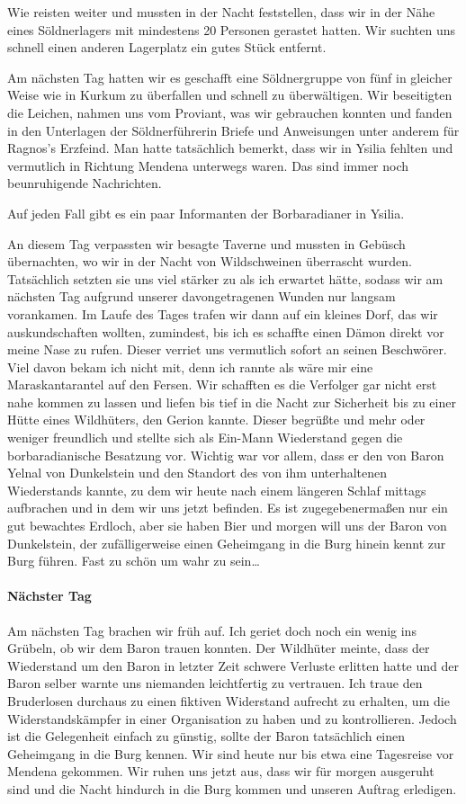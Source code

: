Wie reisten weiter und mussten in der Nacht feststellen, dass wir in der Nähe eines Söldnerlagers mit mindestens 20 Personen gerastet hatten. Wir suchten uns schnell einen anderen Lagerplatz ein gutes Stück entfernt.

Am nächsten Tag hatten wir es geschafft eine Söldnergruppe von fünf in gleicher Weise wie in Kurkum zu überfallen und schnell zu überwältigen. Wir beseitigten die Leichen, nahmen uns vom Proviant, was wir gebrauchen konnten und fanden in den Unterlagen der Söldnerführerin Briefe und Anweisungen unter anderem für Ragnos's Erzfeind. Man hatte tatsächlich bemerkt, dass wir in Ysilia fehlten und vermutlich in Richtung Mendena unterwegs waren. Das sind immer noch beunruhigende Nachrichten.

Auf jeden Fall gibt es ein paar Informanten der Borbaradianer in Ysilia.

An diesem Tag verpassten wir besagte Taverne und mussten in Gebüsch übernachten, wo wir in der Nacht von Wildschweinen überrascht wurden. Tatsächlich setzten sie uns viel stärker zu als ich erwartet hätte, sodass wir am nächsten Tag aufgrund unserer davongetragenen Wunden nur langsam vorankamen. Im Laufe des Tages trafen wir dann auf ein kleines Dorf, das wir auskundschaften wollten, zumindest, bis ich es schaffte einen Dämon direkt vor meine Nase zu rufen. Dieser verriet uns vermutlich sofort an seinen Beschwörer. Viel davon bekam ich nicht mit, denn ich rannte als wäre mir eine Maraskantarantel auf den Fersen. Wir schafften es die Verfolger gar nicht erst nahe kommen zu lassen und liefen bis tief in die Nacht zur Sicherheit bis zu einer Hütte eines Wildhüters, den Gerion kannte. Dieser begrüßte und mehr oder weniger freundlich und stellte sich als Ein-Mann Wiederstand gegen die borbaradianische Besatzung vor. Wichtig war vor allem, dass er den von Baron Yelnal von Dunkelstein und den Standort des von ihm unterhaltenen Wiederstands kannte, zu dem wir heute nach einem längeren Schlaf mittags aufbrachen und in dem wir uns jetzt befinden. Es ist zugegebenermaßen nur ein gut bewachtes Erdloch, aber sie haben Bier und morgen will uns der Baron von Dunkelstein, der zufälligerweise einen Geheimgang in die Burg hinein kennt zur Burg führen. Fast zu schön um wahr zu sein\dots

\paragraph{Nächster Tag}
Am nächsten Tag brachen wir früh auf. Ich geriet doch noch ein wenig ins Grübeln, ob wir dem Baron trauen konnten. Der Wildhüter meinte, dass der Wiederstand um den Baron in letzter Zeit schwere Verluste erlitten hatte und der Baron selber warnte uns niemanden leichtfertig zu vertrauen. Ich traue den Bruderlosen durchaus zu einen fiktiven Widerstand aufrecht zu erhalten, um die Widerstandskämpfer in einer Organisation zu haben und zu kontrollieren. Jedoch ist die Gelegenheit einfach zu günstig, sollte der Baron tatsächlich einen Geheimgang in die Burg kennen. Wir sind heute nur bis etwa eine Tagesreise vor Mendena gekommen. Wir ruhen uns jetzt aus, dass wir für morgen ausgeruht sind und die Nacht hindurch in die Burg kommen und unseren Auftrag erledigen.

